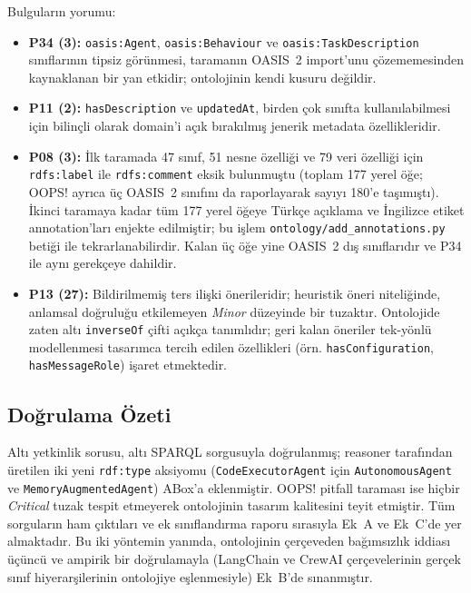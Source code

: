 \documentclass[10pt, a4paper, twocolumn]{article}
\begin{document}
\noindent Bulguların yorumu:
\begin{itemize}
\item \textbf{P34 (3):} \texttt{oasis:Agent}, \texttt{oasis:Behaviour} ve \texttt{oasis:TaskDescription} sınıflarının tipsiz görünmesi, taramanın OASIS~2 import'unu çözememesinden kaynaklanan bir yan etkidir; ontolojinin kendi kusuru değildir.
\item \textbf{P11 (2):} \texttt{hasDescription} ve \texttt{updatedAt}, birden çok sınıfta kullanılabilmesi için bilinçli olarak domain'i açık bırakılmış jenerik metadata özellikleridir.
\item \textbf{P08 (3):} İlk taramada 47 sınıf, 51 nesne özelliği ve 79 veri özelliği için \texttt{rdfs:label} ile \texttt{rdfs:comment} eksik bulunmuştu (toplam 177 yerel öğe; OOPS! ayrıca üç OASIS~2 sınıfını da raporlayarak sayıyı 180'e taşımıştı). İkinci taramaya kadar tüm 177 yerel öğeye Türkçe açıklama ve İngilizce etiket annotation'ları enjekte edilmiştir; bu işlem \texttt{ontology/add\_annotations.py} betiği ile tekrarlanabilirdir. Kalan üç öğe yine OASIS~2 dış sınıflarıdır ve P34 ile aynı gerekçeye dahildir.
\item \textbf{P13 (27):} Bildirilmemiş ters ilişki önerileridir; heuristik öneri niteliğinde, anlamsal doğruluğu etkilemeyen \textit{Minor} düzeyinde bir tuzaktır. Ontolojide zaten altı \texttt{inverseOf} çifti açıkça tanımlıdır; geri kalan öneriler tek-yönlü modellenmesi tasarımca tercih edilen özellikleri (örn. \texttt{hasConfiguration}, \texttt{hasMessageRole}) işaret etmektedir.
\end{itemize}

\subsection{Doğrulama Özeti}

Altı yetkinlik sorusu, altı SPARQL sorgusuyla doğrulanmış; reasoner tarafından üretilen iki yeni \texttt{rdf:type} aksiyomu (\texttt{CodeExecutorAgent} için \texttt{AutonomousAgent} ve \texttt{MemoryAugmentedAgent}) ABox'a eklenmiştir. OOPS! pitfall taraması ise hiçbir \textit{Critical} tuzak tespit etmeyerek ontolojinin tasarım kalitesini teyit etmiştir. Tüm sorguların ham çıktıları ve ek sınıflandırma raporu sırasıyla Ek~A ve Ek~C'de yer almaktadır. Bu iki yöntemin yanında, ontolojinin çerçeveden bağımsızlık iddiası üçüncü ve ampirik bir doğrulamayla (LangChain ve CrewAI çerçevelerinin gerçek sınıf hiyerarşilerinin ontolojiye eşlenmesiyle) Ek~B'de sınanmıştır.
\end{document}

